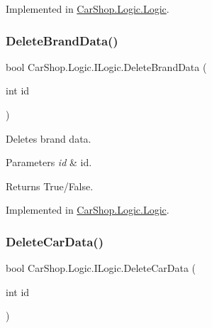 Implemented in \mbox{\hyperlink{class_car_shop_1_1_logic_1_1_logic_a1c3a42d859ae472db17293626b87ff30}{Car\+Shop.\+Logic.\+Logic}}.

\mbox{\label{interface_car_shop_1_1_logic_1_1_i_logic_aa8a7a73b34402f97bdf72e3162b95996}} 
\subsubsection{\texorpdfstring{Delete\+Brand\+Data()}{DeleteBrandData()}}
{\footnotesize\ttfamily bool Car\+Shop.\+Logic.\+I\+Logic.\+Delete\+Brand\+Data (\begin{DoxyParamCaption}\item[{int}]{id }\end{DoxyParamCaption})}



Deletes brand data. 


\begin{DoxyParams}{Parameters}
{\em id} & id.\\
\hline
\end{DoxyParams}
\begin{DoxyReturn}{Returns}
True/\+False.
\end{DoxyReturn}


Implemented in \mbox{\hyperlink{class_car_shop_1_1_logic_1_1_logic_a279fc9fc6ff803ce74bcba0e898ddad4}{Car\+Shop.\+Logic.\+Logic}}.

\mbox{\label{interface_car_shop_1_1_logic_1_1_i_logic_ad11a46d5ab973ec4f7c9a56a1fb98907}} 
\subsubsection{\texorpdfstring{Delete\+Car\+Data()}{DeleteCarData()}}
{\footnotesize\ttfamily bool Car\+Shop.\+Logic.\+I\+Logic.\+Delete\+Car\+Data (\begin{DoxyParamCaption}\item[{int}]{id }\end{DoxyParamCaption})}



